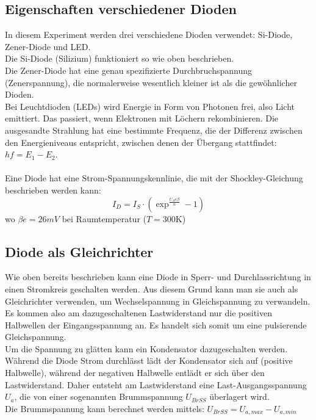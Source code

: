 \documentclass[12pt,a4paper,twopage]{article}
\begin{document}
\subsection{Eigenschaften verschiedener Dioden}
In diesem Experiment werden drei verschiedene Dioden verwendet: Si-Diode, Zener-Diode und LED.\\
Die Si-Diode (Silizium) funktioniert so wie oben beschrieben.\\
Die Zener-Diode hat eine genau spezifizierte Durchbruchspannung (Zenerspannung), die normalerweise wesentlich kleiner ist als die gewöhnlicher Dioden.\\
Bei Leuchtdioden (LEDs) wird Energie in Form von Photonen frei, also Licht emittiert. Das passiert, wenn Elektronen mit Löchern rekombinieren. Die ausgesandte Strahlung hat eine bestimmte Frequenz, die der Differenz zwischen den Energieniveaus entspricht, zwischen denen der Übergang stattfindet: $hf = E_1 - E_2$.\\
\\
Eine Diode hat eine Strom-Spannungskennlinie, die mit der Shockley-Gleichung beschrieben werden kann:
\begin{equation}
I_D=I_S\cdot\left(\exp^{\frac{U_A e \beta}{n}}-1\right)
\label{shockley}
\end{equation}
wo $\beta e=26\si{mV}$ bei Raumtemperatur ($T=300$K)

\subsection{Diode als Gleichrichter}
Wie oben bereits beschrieben kann eine Diode in Sperr- und Durchlassrichtung in einen Stromkreis geschalten werden. Aus diesem Grund kann man sie auch als Gleichrichter verwenden, um Wechselspannung in Gleichspannung zu verwandeln. Es kommen also am dazugeschaltenen Lastwiderstand  nur die positiven Halbwellen der Eingangsspannung an. Es handelt sich somit um eine pulsierende Gleichspannung.\\
Um die Spannung zu glätten kann ein Kondensator dazugeschalten werden. Während die Diode Strom durchlässt lädt der Kondensator sich auf (positive Halbwelle), während der negativen Halbwelle entlädt er sich über den Lastwiderstand. Daher entsteht am Lastwiderstand eine Last-Ausgangsspannung $U_a$, die von einer sogenannten Brummspannung $U_{BrSS}$ überlagert wird.\\
Die Brummspannung kann berechnet werden mittels: $U_{BrSS}=U_{a,max}-U_{a,min}$\\
\end{document}
